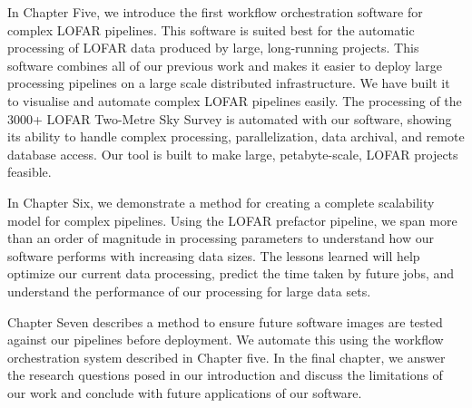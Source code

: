 In Chapter Five, we introduce the first workflow orchestration software for complex LOFAR pipelines. This software is suited best for the automatic processing of LOFAR data produced by large, long-running projects. This software combines all of our previous work and makes it easier to deploy large processing pipelines on a large scale distributed infrastructure. We have built it to visualise and automate complex LOFAR pipelines easily. The processing of the 3000+ LOFAR Two-Metre Sky Survey is automated with our software, showing its ability to handle complex processing, parallelization, data archival, and remote database access. Our tool is built to make large, petabyte-scale, LOFAR projects feasible.

In Chapter Six, we demonstrate a method for creating a complete scalability model for complex pipelines. Using the LOFAR prefactor pipeline, we span more than an order of magnitude in processing parameters to understand how our software performs with increasing data sizes. The lessons learned will help optimize our current data processing, predict the time taken by future jobs, and understand the performance of our processing for large data sets. 

Chapter Seven describes a method to ensure future software images are tested against our pipelines before deployment. We automate this using the workflow orchestration system described in Chapter five. In the final chapter, we answer the research questions posed in our introduction and discuss the limitations of our work and conclude with future applications of our software.
